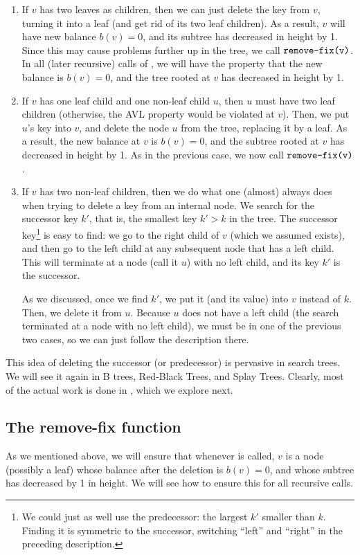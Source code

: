 \begin{enumerate}
\item If $v$ has two leaves as children, then we can just delete the
  key from $v$, turning it into a leaf (and get rid of its two leaf
  children). As a result, $v$ will have new balance $b(v) = 0$, and
  its subtree has decreased in height by 1.
  Since this may cause problems further up in the tree, we 
  call $\texttt{remove-fix(v)}$. 
  In all (later recursive) calls of , we will have
  the property that the new balance is $b(v) = 0$, and the tree rooted
  at $v$ has decreased in height by 1.
\item If $v$ has one leaf child and one non-leaf child $u$, then $u$
  must have two leaf children (otherwise, the AVL property would be
  violated at $v$). Then, we put $u$'s key into $v$, and delete the
  node $u$ from the tree, replacing it by a leaf.
  As a result, the new balance at $v$ is $b(v) = 0$, and the subtree
  rooted at $v$ has decreased in height by 1.
  As in the previous case, we now call $\texttt{remove-fix(v)}$.
\item If $v$ has two non-leaf children, then we do what one (almost)
  always does when trying to delete a key from an internal node.
  We search for the successor key $k'$, that is, the smallest key 
  $k' > k$ in the tree.  
  The successor key\footnote{We could just as well use the
  predecessor: the largest $k'$ smaller than $k$. 
  Finding it is symmetric to the successor, switching ``left''
  and ``right'' in the preceding description.} is easy to find: 
  we go to the right child of $v$ (which we assumed exists), 
  and then go to the left child at any
  subsequent node that has a left child. This will terminate at a node
  (call it $u$) with no left child, and its key $k'$ is the successor.

  As we discussed, once we find $k'$, we put it (and its value) into
  $v$ instead of $k$. 
  Then, we delete it from $u$. Because $u$ does not have a left child
  (the search terminated at a node with no left child), we must be in
  one of the previous two cases, so we can just follow the description
  there. 
\end{enumerate}

This idea of deleting the successor (or predecessor) is pervasive in
search trees. 
We will see it again in B trees, Red-Black Trees, and Splay Trees. 
Clearly, most of the actual work is done in , which
we explore next.

\subsection{The remove-fix function}
As we mentioned above, we will ensure that whenever 
 is called, $v$ is a node (possibly a leaf) whose
balance after the deletion is $b(v) = 0$, and whose subtree has
decreased by 1 in height. We will see how to ensure this for all
recursive calls.

